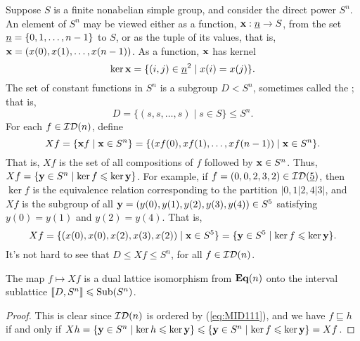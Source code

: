 Suppose $S$ is a finite nonabelian simple group, and consider the direct power $S^n$.
An element of $S^n$ may be viewed either as a function, $\mathbf{x} : \underline{n} \to S$,
from the set $\underline{n} = \{0, 1, \dots, n-1\}$ to $S$, or as the tuple 
of its values, that is,
%
%
    $\mathbf{x} = (x(0), x(1), \dots, x(n-1))$.
%
As a function, $\mathbf{x}$ has kernel
\[
\ker \mathbf{x} = \{(i,j) \in \underline{n}^2 \mid x(i) = x(j)\}.
\]
The set of constant functions in $S^n$ is a subgroup $D < S^n$, sometimes called the
; that is,
\[
D = \{(s, s, \dots, s) \mid s\in S\} \leq S^n.
\]
For each $f \in \mathcal{ID}(n)$, define
\[
Xf = \{\mathbf{x} f \mid \mathbf{x} \in S^n\} =
\{(xf(0), xf(1), \dots, xf(n-1)) \mid \mathbf{x} \in S^n\}.
\]
That is, $Xf$ is the set of all compositions of
$f$ followed by $\mathbf{x}\in S^n$.
Thus, $Xf = \{ \mathbf{y}\in S^n \mid \ker f \leqslant \ker \mathbf{y} \}$.
For example, 
if $f = (0, 0, 2, 3, 2)\in \mathcal{ID}(\underline{5})$, then 
$\ker f$ is the equivalence relation corresponding to
the partition $|0,1|2,4|3|$, and 
$Xf$ is the subgroup of all
$\mathbf{y} = (y(0), y(1), y(2), y(3), y(4))\in S^5$ satisfying $y(0) = y(1)$ and
$y(2) = y(4)$. That is,
\[Xf = \{(x(0), x(0), x(2), x(3), x(2)) \mid \mathbf{x}\in S^5\}
=\{\mathbf{y}\in S^5 \mid \ker f \leqslant \ker \mathbf{y}\}.\]
It's not hard to see that $D \leq Xf\leq S^n$, for all $f\in \mathcal{ID}(n)$.

\begin{lemma}
  \label{lem:latt-duals}
  The map $f \mapsto Xf$ is a dual lattice isomorphism from $\mathbf{Eq}(n)$ onto the
  interval sublattice $\llbracket D, S^n\rrbracket \leqslant \operatorname{Sub}(S^n)$.
\end{lemma}
\begin{proof}
  This is clear since $\mathcal{ID}(n)$ is ordered by (\ref{eq:MID111}), and 
  we have 
  $f\sqsubseteq h$ if and only if
  $Xh = \{\mathbf{y} \in S^n \mid \ker h \leqslant \ker \mathbf{y} \}
  \leqslant \{\mathbf{y} \in S^n \mid \ker f \leqslant \ker \mathbf{y} \} =  Xf$.
\end{proof}

